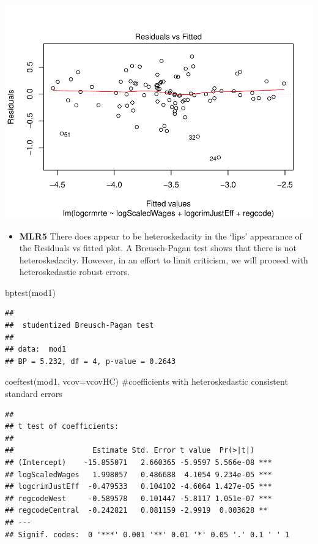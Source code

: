 \documentclass[]{article}
\newenvironment{Shaded}{}{}
\newcommand{\CommentTok}[1]{\textcolor[rgb]{0.00,0.50,0.00}{#1}}
\newcommand{\DataTypeTok}[1]{#1}
\newcommand{\KeywordTok}[1]{\textcolor[rgb]{0.00,0.00,1.00}{#1}}
\newcommand{\NormalTok}[1]{#1}
\providecommand{\tightlist}{%
  \setlength{\itemsep}{0pt}\setlength{\parskip}{0pt}}
\begin{document}
\includegraphics{Bagnard_Gaustad_Hartman_Leung_Lab_3_files/figure-latex/unnamed-chunk-63-1.pdf}

\begin{itemize}
\tightlist
\item
  \textbf{MLR5} There does appear to be heteroskedacity in the `lips'
  appearance of the Residuals vs fitted plot. A Breusch-Pagan test shows
  that there is not heteroskedacity. However, in an effort to limit
  criticism, we will proceed with heteroskedastic robust errors.
\end{itemize}

\begin{Shaded}
\begin{Highlighting}[]
\KeywordTok{bptest}\NormalTok{(mod1)}
\end{Highlighting}
\end{Shaded}

\begin{verbatim}
## 
##  studentized Breusch-Pagan test
## 
## data:  mod1
## BP = 5.232, df = 4, p-value = 0.2643
\end{verbatim}

\begin{Shaded}
\begin{Highlighting}[]
\KeywordTok{coeftest}\NormalTok{(mod1, }\DataTypeTok{vcov=}\NormalTok{vcovHC) }\CommentTok{#coefficients with heteroskedastic consistent standard errors}
\end{Highlighting}
\end{Shaded}

\begin{verbatim}
## 
## t test of coefficients:
## 
##                  Estimate Std. Error t value  Pr(>|t|)    
## (Intercept)    -15.855071   2.660365 -5.9597 5.566e-08 ***
## logScaledWages   1.998057   0.486688  4.1054 9.234e-05 ***
## logcrimJustEff  -0.479533   0.104102 -4.6064 1.427e-05 ***
## regcodeWest     -0.589578   0.101447 -5.8117 1.051e-07 ***
## regcodeCentral  -0.242821   0.081159 -2.9919  0.003628 ** 
## ---
## Signif. codes:  0 '***' 0.001 '**' 0.01 '*' 0.05 '.' 0.1 ' ' 1
\end{verbatim}
\end{document}
